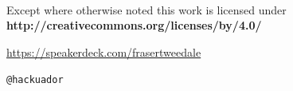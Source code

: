 \documentclass[ignorenonframetext,aspectratio=169]{beamer}
\begin{document}
\begin{frame}[plain]




    \setlength{\parskip}{.5em}

    { \centering

    
    \\
    { \scriptsize
    Except where otherwise noted this work is licensed under
    }\\
    { \footnotesize
    \textbf{http://creativecommons.org/licenses/by/4.0/}
    }

    \bigskip
    \Large

    \url{https://speakerdeck.com/frasertweedale}

    \texttt{@hackuador}

    }


\end{frame}
\end{document}
